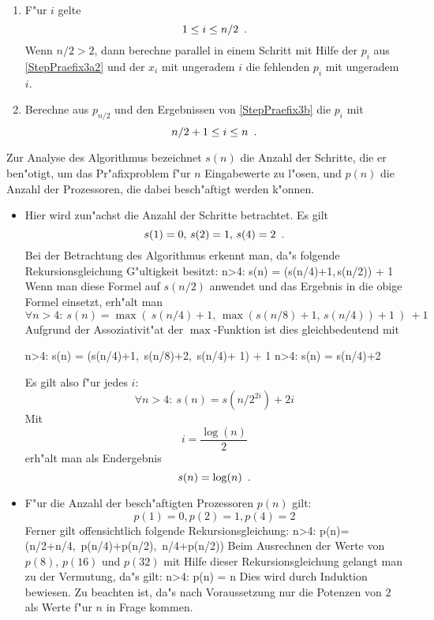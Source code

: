 \begin{beweis}
\begin{enumerate}
          \begin{enumerate}
          \item \label{StepPraefix4a}
               F"ur $i$ gelte \[ 1 \leq i \leq n/2 \mbox{\hspace{0.5em}.} \]
               Wenn $n/2 > 2$, dann
               berechne parallel in einem Schritt mit Hilfe der $p_i$
               aus \ref{StepPraefix3a2} und der $x_i$ mit ungeradem $i$
               die fehlenden $p_i$ mit ungeradem $i$.
          \item \label{StepPraefix4b}
                Berechne aus $p_{n/2}$ und den Ergebnissen von 
                \ref{StepPraefix3b} die $p_i$ mit
                \[ n/2+1 \leq i \leq n \mbox{\hspace{0.5em}.} \]
          \end{enumerate}
    \end{enumerate}
    Zur Analyse des Algorithmus bezeichnet $s(n)$ die Anzahl der Schritte,
    die er ben"otigt, um das Pr"afixproblem f"ur $n$ Eingabewerte zu
    l"osen, und $p(n)$ die Anzahl der Prozessoren, die dabei besch"aftigt
    werden k"onnen.
    \begin{itemize}
    \item Hier wird zun"achst die Anzahl der Schritte betrachtet.
          Es gilt \[ s(1) = 0,\,s(2) = 1,\, s(4) = 2 \mbox{\hspace{0.5em}.} \]
          Bei der Betrachtung des Algorithmus erkennt man, da"s folgende
          Rekursionsgleichung G"ultigkeit besitzt:
              \forall n>4: \: s(n) = \max(s(n/4)+1,\,s(n/2)) + 1 \MyPunkt
          \Eeq
          Wenn man diese Formel auf $s(n/2)$ anwendet und das Ergebnis in
          die obige Formel einsetzt, erh"alt man
          \[ \forall n>4: \: s(n) = 
                 \max(\: s(n/4)+1,\, \max(s(n/8)+1,\, s(n/4))+1 \:) \:+ 1 
          \]
          Aufgrund der Assoziativit"at der $\max$-Funktion ist dies
          gleichbedeutend mit
          \begin{MyEqnArray}
             \MT \forall n>4: \: s(n) \MT = \MT
                 \max(s(n/4)+1,\, s(n/8)+2,\, s(n/4)+ 1) + 1 \MNl
             \Rightarrow 
             \MT \forall n>4: \: s(n) \MT = \MT s(n/4)+2 
          \end{MyEqnArray}
          Es gilt also f"ur jedes $i$:
          \[ \forall n>4: \: s(n) = s(n/2^{2i}) + 2i \]
          Mit \[ i = \frac{\log(n)}{2} \] erh"alt man als Endergebnis 
          \[ s(n) = \log(n) \mbox{\hspace{0.5em}.} \]
    \item F"ur die Anzahl der besch"aftigten Prozessoren $p(n)$ gilt:
          \[ p(1) = 0, p(2) = 1, p(4)= 2 \]
          Ferner gilt offensichtlich folgende Rekursionsgleichung:
              \forall n>4:\: p(n)= 
              \max(n/2+n/4,\, p(n/4)+p(n/2),\, n/4+p(n/2))
          \Eeq
          Beim Ausrechnen der Werte von $p(8)$, $p(16)$ und $p(32)$
          mit Hilfe dieser Rekursionsgleichung gelangt man zu der
          Vermutung, da"s gilt:
              \forall n>4: \: p(n) =  n 
          \Eeq
          Dies wird durch Induktion bewiesen. Zu beachten
          ist, da"s nach Voraussetzung nur die Potenzen von $2$ als Werte
          f"ur $n$ in Frage kommen. 
          

\end{itemize}
\end{beweis}
